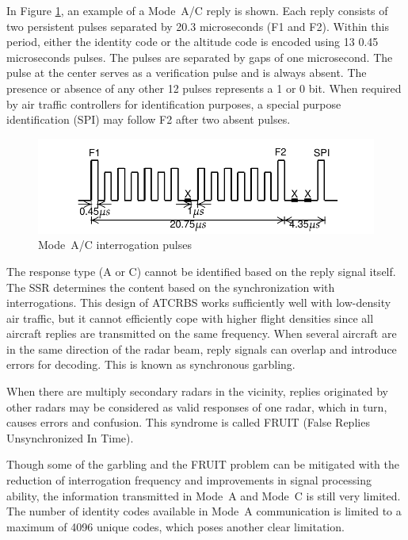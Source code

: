 In Figure \ref{fig:mode_ac_downlink_pulses}, an example of a Mode~A/C reply is shown. Each reply consists of two persistent pulses separated by 20.3 microseconds (F1 and F2). Within this period, either the identity code or the altitude code is encoded using 13 0.45 microseconds pulses. The pulses are separated by gaps of one microsecond. The pulse at the center serves as a verification pulse and is always absent. The presence or absence of any other 12 pulses represents a 1 or 0 bit. When required by air traffic controllers for identification purposes, a special purpose identification (SPI) may follow F2 after two absent pulses.

\begin{figure}[ht]
  \includegraphics[scale=0.8]{figures/intro/mode_ac_downlink_pulses.pdf}
  \caption{Mode~A/C interrogation pulses}
  \label{fig:mode_ac_downlink_pulses}
\end{figure}

The response type (A or C) cannot be identified based on the reply signal itself. The SSR determines the content based on the synchronization with interrogations. This design of ATCRBS works sufficiently well with low-density air traffic, but it cannot efficiently cope with higher flight densities since all aircraft replies are transmitted on the same frequency. When several aircraft are in the same direction of the radar beam, reply signals can overlap and introduce errors for decoding. This is known as synchronous garbling.

When there are multiply secondary radars in the vicinity, replies originated by other radars may be considered as valid responses of one radar, which in turn, causes errors and confusion. This syndrome is called FRUIT (False Replies Unsynchronized In Time).

Though some of the garbling and the FRUIT problem can be mitigated with the reduction of interrogation frequency and improvements in signal processing ability, the information transmitted in Mode~A and Mode~C is still very limited. The number of identity codes available in Mode~A communication is limited to a maximum of 4096 unique codes, which poses another clear limitation.

